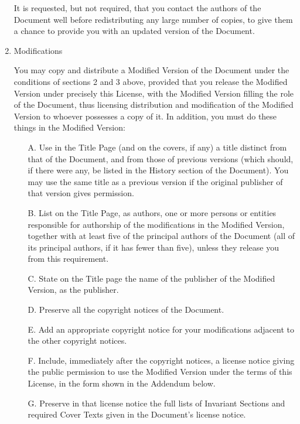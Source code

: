 \begin{enumerate}
It is requested, but not required, that you contact the authors of the
Document well before redistributing any large number of copies, to give
them a chance to provide you with an updated version of the Document.


\item Modifications

You may copy and distribute a Modified Version of the Document under
the conditions of sections 2 and 3 above, provided that you release
the Modified Version under precisely this License, with the Modified
Version filling the role of the Document, thus licensing distribution
and modification of the Modified Version to whoever possesses a copy
of it.  In addition, you must do these things in the Modified Version:

\begin{itemize}
\item[A.] 
   Use in the Title Page (and on the covers, if any) a title distinct
   from that of the Document, and from those of previous versions
   (which should, if there were any, be listed in the History section
   of the Document).  You may use the same title as a previous version
   if the original publisher of that version gives permission.
   
\item[B.]
   List on the Title Page, as authors, one or more persons or entities
   responsible for authorship of the modifications in the Modified
   Version, together with at least five of the principal authors of the
   Document (all of its principal authors, if it has fewer than five),
   unless they release you from this requirement.
   
\item[C.]
   State on the Title page the name of the publisher of the
   Modified Version, as the publisher.
   
\item[D.]
   Preserve all the copyright notices of the Document.
   
\item[E.]
   Add an appropriate copyright notice for your modifications
   adjacent to the other copyright notices.
   
\item[F.]
   Include, immediately after the copyright notices, a license notice
   giving the public permission to use the Modified Version under the
   terms of this License, in the form shown in the Addendum below.
   
\item[G.]
   Preserve in that license notice the full lists of Invariant Sections
   and required Cover Texts given in the Document's license notice.
   

\end{itemize}
\end{enumerate}
